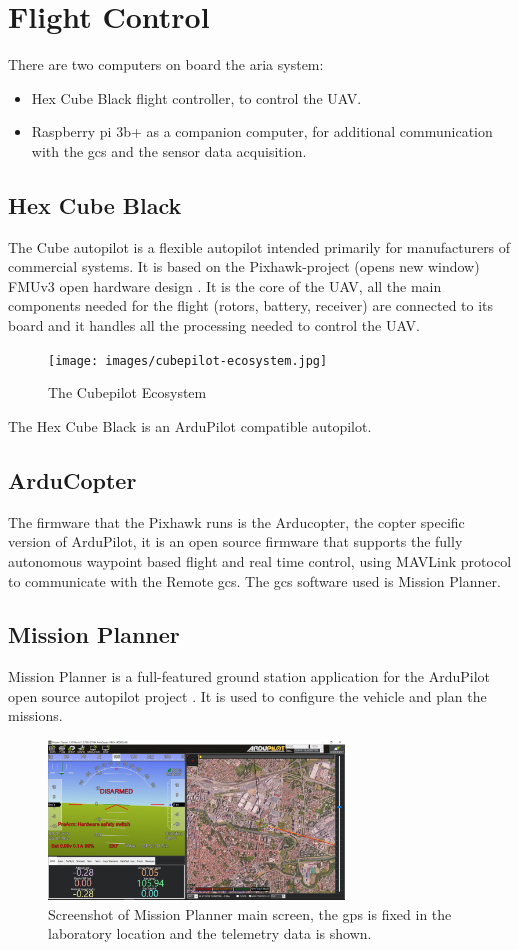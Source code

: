 \chapter{Flight Control}
There are two computers on board the \gls{aria} system:
\begin{itemize}
    \item Hex Cube Black flight controller, to control the UAV.
    \item Raspberry pi 3b+ as a companion computer, for additional communication with the \gls{gcs} and the sensor data acquisition.
\end{itemize}
\section{Hex Cube Black}
The Cube autopilot is a flexible autopilot intended primarily for manufacturers of commercial systems. It is based on the Pixhawk-project (opens new window) FMUv3 open hardware design \cite{ardupilot}. It is the core of the UAV, all the main components needed for the flight (rotors, battery, receiver) are connected to its board and it handles all the processing needed to control the UAV.
\begin{figure}[H]
    \centering
    \texttt{[image: images/cubepilot-ecosystem.jpg]}
    \caption{The Cubepilot Ecosystem\cite{ardupilot}}
    \label{fig:cubepilot-ecosystem}
\end{figure}
The Hex Cube Black is an ArduPilot compatible autopilot.
\section{ArduCopter}
The firmware that the Pixhawk runs is the Arducopter, the copter specific version of ArduPilot, it is an open source firmware that supports the fully autonomous waypoint based flight and real time control, using MAVLink protocol to communicate with the Remote \gls{gcs}. The \gls{gcs} software used is Mission Planner.
\section{Mission Planner}
Mission Planner is a full-featured ground station application for the ArduPilot open source autopilot project \cite{ardupilot}.
It is used to configure the vehicle and plan the missions.
\begin{figure}[H]
    \centering
    \includegraphics[width=0.7\textwidth]{images/mission-planner.PNG}
    \caption{Screenshot of Mission Planner main screen, the gps is fixed in the laboratory location and the telemetry data is shown.}
    \label{fig:mission-planner}
\end{figure}
